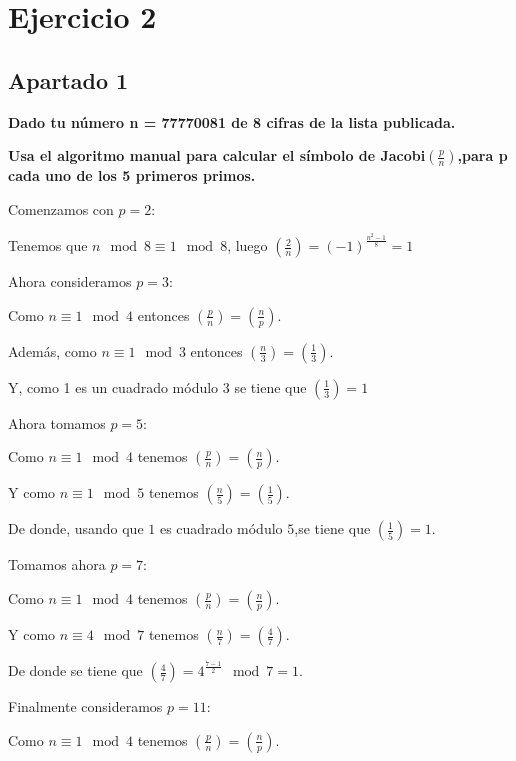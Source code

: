 \documentclass[a4paper]{article}
\title {\fbox{\Huge{\textbf{Ejercicio 2}}}}
\author {\fbox{Ana Buendía Ruiz-Azuaga}}
\begin{document}
\maketitle


\section{Ejercicio 2}
\subsection{Apartado 1}
\textbf{Dado tu número n = 77770081 de 8 cifras de la lista publicada.}

\textbf{Usa el algoritmo manual para calcular el símbolo de Jacobi$\left(\frac{p}{n}\right)$,para p cada uno de los 5 primeros primos.}

Comenzamos con $p=2$:

Tenemos que $n \mod 8\equiv 1 \mod 8$, luego $\left( \frac{2}{n}\right)=(-1)^{\frac{n^2-1}{8}}=1$

Ahora consideramos $p=3$:

Como $n\equiv 1 \mod 4$ entonces $\left( \frac{p}{n} \right)=\left( \frac{n}{p} \right)$.

Además, como $n\equiv 1 \mod 3$ entonces $\left( \frac{n}{3} \right)=\left( \frac{1}{3} \right)$.

Y, como 1 es un cuadrado módulo $3$ se tiene que $\left( \frac{1}{3} \right)=1$

Ahora tomamos $p=5$:

Como $n\equiv 1 \mod 4$ tenemos $\left( \frac{p}{n} \right) = \left( \frac{n}{p} \right)$.

Y como $n \equiv 1 \mod 5$ tenemos $\left( \frac{n}{5} \right)=\left( \frac{1}{5} \right)$.

De donde, usando que $1$ es cuadrado módulo $5$,se tiene que $\left( \frac{1}{5} \right)=1$.

Tomamos ahora $p=7$:

Como $n\equiv 1 \mod 4$ tenemos $\left( \frac{p}{n} \right) = \left( \frac{n}{p} \right)$.

Y como $n \equiv 4 \mod 7$ tenemos $\left( \frac{n}{7} \right)=\left( \frac{4}{7} \right)$.

De donde se tiene que $\left( \frac{4}{7} \right)=4^{\frac{7-1}{2}}\mod 7=1$.

Finalmente consideramos $p=11$:

Como $n\equiv 1 \mod 4$ tenemos $\left( \frac{p}{n} \right) = \left( \frac{n}{p} \right)$.
\end{document}
